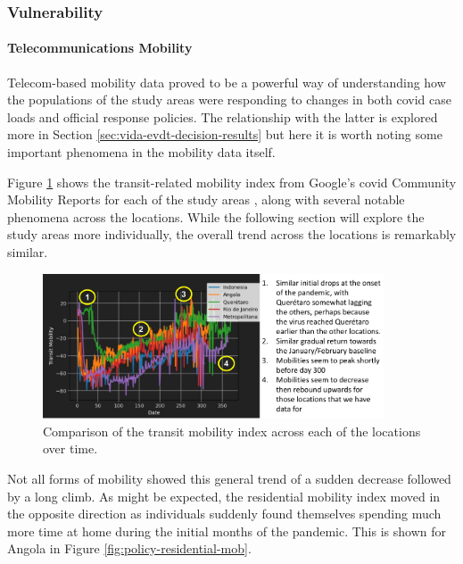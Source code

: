 \subsubsection{Vulnerability} \label{sec:vida-evdt-v-result}

\paragraph{Telecommunications Mobility} \leavevmode\newline

Telecom-based mobility data proved to be a powerful way of understanding how the populations of the study areas were responding to changes in both \ac{covid} case loads and official response policies. The relationship with the latter is explored more in Section \ref{sec:vida-evdt-decision-results} but here it is worth noting some important phenomena in the mobility data itself.

Figure \ref{fig:transit-mobility-comparison} shows the transit-related mobility index from Google's \ac{covid} Community Mobility Reports for each of the study areas \cite{googleCOVID19CommunityMobility}, along with several notable phenomena across the locations. While the following section will explore the study areas more individually, the overall trend across the locations is remarkably similar. 

\begin{figure}[!htb]
\centering
\includegraphics[width=0.9\textwidth]{Figures/chap5/transit-mobility-comparison.png}
\caption[Transit Mobility Over Time for All Locations]{Comparison of the transit mobility index across each of the locations over time.}
\label{fig:transit-mobility-comparison}
\end{figure}

Not all forms of mobility showed this general trend of a sudden decrease followed by a long climb. As might be expected, the residential mobility index moved in the opposite direction as individuals suddenly found themselves spending much more time at home during the initial months of the pandemic. This is shown for Angola in Figure \ref{fig:policy-residential-mob}.

